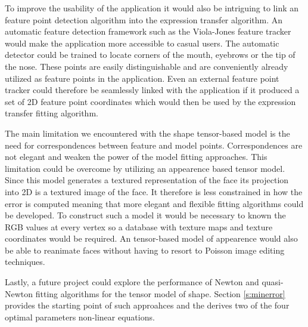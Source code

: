 \documentclass[11pt,a4paper]{report}
\begin{document}
To improve the usability of the application it would also be intriguing to link
an feature point detection algorithm into the expression transfer algorithm. An
automatic feature detection framework such as the Viola-Jones feature tracker
\cite{viola} would make the application more accessible to casual users. The automatic detector could be trained to locate corners of the
mouth, eyebrows or the tip of the nose. These points are easily distinguishable
and are conveniently already utilized as feature points in the application. Even an external feature point tracker could therefore be
seamlessly linked with the application if it produced a set of 2D feature
point coordinates which would then be used by the expression transfer fitting algorithm.

The main limitation we encountered with the shape tensor-based model is the need for
correspondences between feature and model points. Correspondences are not
elegant and weaken the power of the model fitting approaches. This limitation
could be overcome by utilizing an appearence based tensor model. Since this
model generates a textured representation of the face its projection into
2D is a textured image of the face. It therefore is less constrained in how the
error is computed meaning that more elegant and flexible fitting algorithms
could be developed. To construct such a model it would be necessary to known the
RGB values at every vertex so a database with texture maps and texture
coordinates would be required. An tensor-based model of appearence would also
be able to reanimate faces without having to resort to Poisson image editing
techniques.

Lastly, a future project could explore the performance of Newton and quasi-Newton fitting
algorithms for the tensor model of shape. Section \ref{s:minerror} provides the starting point of such
approahces and the derives two of the four optimal parameters non-linear equations.


\end{document}
